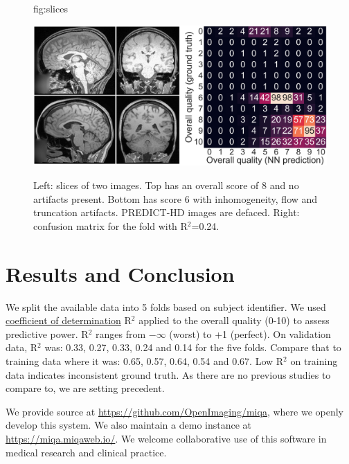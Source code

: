\documentclass{midl} %
\begin{document}
\begin{figure}[ptb] %
\floatconts
  {fig:slices}
  {\caption{Left: slices of two images. Top has an overall score of 8 and no artifacts present. Bottom has score 6 with inhomogeneity, flow and truncation artifacts. PREDICT-HD images are defaced. Right: confusion matrix for the fold with R$^2$=0.24.}}
  {
  \includegraphics[width=0.99\linewidth]{figure.png}
  \vspace{-1.3\baselineskip} %
  }
\end{figure}

\section{Results and Conclusion}

We split the available data into 5 folds based on subject identifier. We used \href{https://en.wikipedia.org/wiki/Coefficient_of_determination}{coefficient of determination} R$^2$ applied to the overall quality (0-10) to assess predictive power.
R$^2$ ranges from $-\infty$ (worst) to +1 (perfect).
On validation data, R$^2$ was: 0.33, 0.27, 0.33, 0.24 and 0.14 for the five folds. Compare that to training data where it was: 0.65, 0.57, 0.64, 0.54 and 0.67.
Low R$^2$ on training data indicates inconsistent ground truth.
As there are no previous studies to compare to, we are setting precedent.

We provide source at \url{https://github.com/OpenImaging/miqa}, where we openly develop this system. We also maintain a demo instance at \url{https://miqa.miqaweb.io/}.
We welcome collaborative use of this software in medical research and clinical practice.



\end{document}
